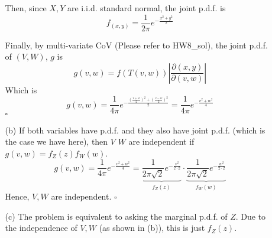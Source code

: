 \documentclass[12pt]{article}
\begin{document}
\begin{enumerate}
\begin{itemize}
    Then, since \(X,Y\) are i.i.d. standard normal, the joint p.d.f. is   
    \[
        f_(x,y)  = \frac{1}{2\pi }e^{-\frac{x^{2}+y^2 }{2}}
    \]

    Finally, by multi-variate CoV (Please refer to HW8\_sol), the joint p.d.f. of \((V,W)\), \(g\) is  
       \[
        g(v,w) = f(T(v,w))\left\vert \frac{\partial (x,y)}{\partial (v,w)} \right\vert 
       \]
    Which is 
    \[
        g(v,w) = \frac{1}{4 \pi }e^{-\frac{(\frac{v+w}{2})^2 + (\frac{v-w}{2})^2}{2}}  
            = \frac{1}{4 \pi }e^{-\frac{v^2 +w^2}{4}} 
    \]
    \hspace{\textwidth}\(\square \) 
    \item[(b)]
    If both variables have p.d.f. and they also have joint p.d.f. (which is the case we have here), then \(V\) \(W\) are independent if \(g(v,w) = f_Z(z)f_{W}(w)\). 
    \[
        g(v,w)  = \frac{1}{4 \pi }e^{-\frac{v^2 +w^2}{4}}  = \underbrace{\frac{1}{2\pi \sqrt{2} }e^{-\frac{v^2}{2\cdot 2}}}_{f_Z(z)} \cdot \underbrace{\frac{1}{2\pi \sqrt{2} }e^{-\frac{w^2}{2\cdot 2}}}_{f_W(w)}
    \]  
    Hence, \(V,W\) are independent. 
    \hspace{\textwidth}\(\square \) 
    \item[(c)]
    The problem is equivalent to asking the marginal p.d.f. of \(Z\). 
    Due to the independence of \(V,W\) (as shown in (b)), this is just \(f_Z(z)\).     
    

\end{itemize}
\end{enumerate}
\end{document}
